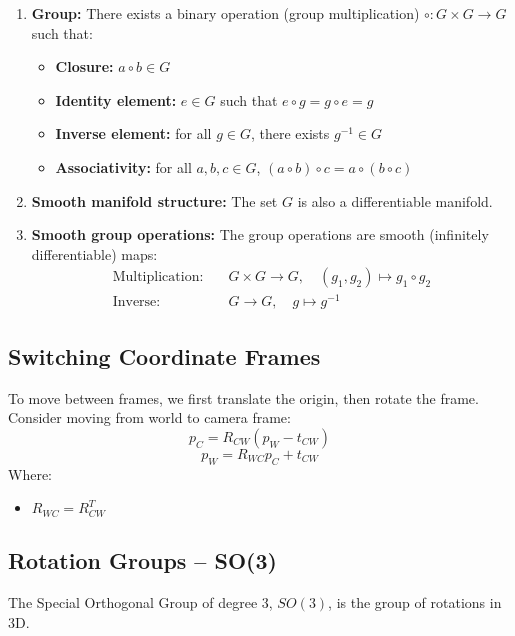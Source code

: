 \documentclass[11pt,a4paper]{article}
\begin{document}
\begin{enumerate}[label=\arabic*.]
    \item \textbf{Group:}
    There exists a binary operation (group multiplication)
    \(\circ : G \times G \rightarrow G\)
    such that:
    \begin{itemize}
        \item \textbf{Closure:} \( a \circ b \in G \)
        \item \textbf{Identity element:} \( e \in G \) such that \( e \circ g = g \circ e = g \)
        \item \textbf{Inverse element:} for all \( g \in G \), there exists \( g^{-1} \in G \)
        \item \textbf{Associativity:} for all \( a,b,c \in G \), \( (a \circ b) \circ c = a \circ (b \circ c) \)
    \end{itemize}

    \item \textbf{Smooth manifold structure:}
    The set \( G \) is also a differentiable manifold.

    \item \textbf{Smooth group operations:}
    The group operations are smooth (infinitely differentiable) maps:
    \[
    \begin{aligned}
    \text{Multiplication:} &\quad G \times G \to G, \quad (g_1, g_2) \mapsto g_1 \circ g_2 \\
    \text{Inverse:} &\quad G \to G, \quad g \mapsto g^{-1}
    \end{aligned}
    \]
\end{enumerate}

\subsection*{Switching Coordinate Frames}

To move between frames, we first translate the origin, then rotate the frame. Consider moving from world to camera frame:
\[
p_C = R_{CW} (p_W - t_{CW})
\]
\[
p_W = R_{WC} p_C + t_{CW}
\]
Where:
\begin{itemize}
    \item \( R_{WC} = R_{CW}^T \)
\end{itemize}

\subsection*{Rotation Groups -- SO(3)}

The Special Orthogonal Group of degree 3, \( SO(3) \), is the group of rotations in 3D.
\end{document}
